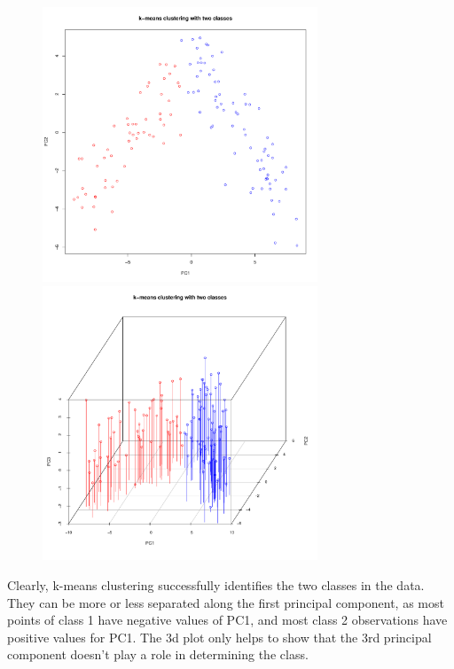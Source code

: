 \documentclass{article}
\begin{document}
\begin{figure}[h]				%
	\centering
	\includegraphics[width=8.2cm]{DA3/Plots/kmeans_2dplot.pdf}
	\includegraphics[width=8.2cm]{DA3/Plots/kmeans_3dplot.pdf}
	\caption{}
\end{figure}

Clearly, k-means clustering successfully identifies the two classes in the data. They can be more or less separated along the first principal component, as most points of class 1 have negative values of PC1, and most class 2 observations have positive values for PC1. The 3d plot only helps to show that the 3rd principal component doesn't play a role in determining the class.
\end{document}
